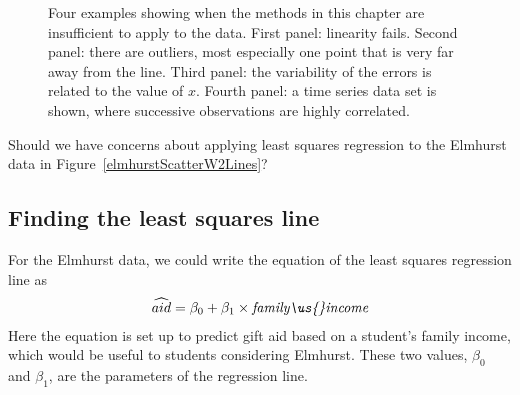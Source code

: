 \begin{figure}[h]
  \centering
  \caption{Four examples showing when the methods in this
      chapter are insufficient to apply to the data.
      First panel: linearity fails.
      Second panel: there are outliers, most especially
      one point that is very far away from the line.
      Third panel: the variability of the errors is related
      to the value of $x$.
      Fourth panel: a time series data set is shown,
      where successive observations are highly correlated.}
  \label{whatCanGoWrongWithLinearModel}
\end{figure}

\begin{exercisewrap}
\begin{nexercise}
Should we have concerns about applying least squares regression to the Elmhurst data in Figure~\ref{elmhurstScatterW2Lines}?\footnotemark
\end{nexercise}
\end{exercisewrap}


\subsection{Finding the least squares line}
\label{findingTheLeastSquaresLineSection}

For the Elmhurst data, we could write the equation of the least squares regression line as
\begin{eqnarray*}
\widehat{aid} = \beta_0 + \beta_{1}\times
    \textit{family\us{}income}
\end{eqnarray*}
Here the equation is set up to predict gift aid based on a student's family income, which would be useful to students considering Elmhurst. These two values, $\beta_0$ and $\beta_1$, are the parameters of the regression line.

